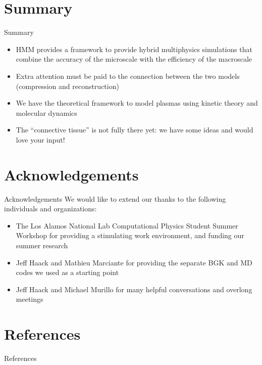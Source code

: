 \documentclass{beamer}
\begin{document}
	\section{Summary}
	\begin{frame}{Summary}
		\begin{itemize}
			\item HMM provides a framework to provide hybrid multiphysics simulations that combine the accuracy of the microscale with the efficiency of the macroscale
			\vspace{1em}
			\item Extra attention must be paid to the connection between the two models (compression and reconstruction)
			\vspace{1em}
			\item We have the theoretical framework to model plasmas using kinetic theory and molecular dynamics
			\vspace{1em}
			\item The ``connective tissue'' is not fully there yet: we have some ideas and would love your input!
		\end{itemize}
	\end{frame}
	
	\section{Acknowledgements}
	\begin{frame}{Acknowledgements}
		We would like to extend our thanks to the following individuals and organizations:\vspace{1em}
		\begin{itemize}
		\item The Los Alamos National Lab Computational Physics Student Summer Workshop for providing a stimulating work environment, and funding our summer research\vspace{1em}
		\item Jeff Haack and Mathieu Marciante for providing the separate BGK and MD codes we used as a starting point\vspace{1em}
		\item Jeff Haack and Michael Murillo for many helpful conversations and overlong meetings
		\end{itemize}
	\end{frame}
	
	\section{References}
	\begin{frame}[allowframebreaks]{References}
	\nocite{weinan2007heterogeneous,weinan2011principles,klimontovich1983kinetic,ren2005heterogeneous,franklin2000boltzmann,hadjiconstantinou1997heterogeneous,flekkoy2000hybrid,nie2004continuum,li1999nearly}
		
	\end{frame}
	
\end{document}
